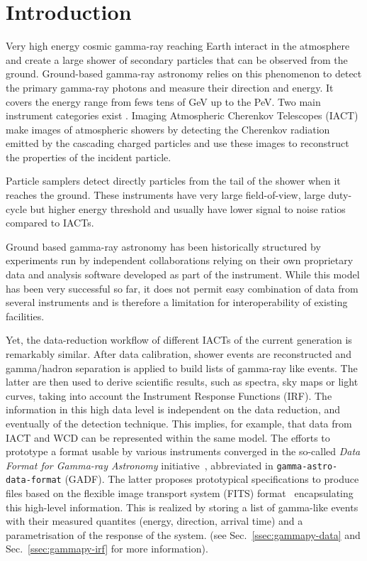 \section{Introduction}
\label{sec:introduction}



Very high energy cosmic gamma-ray reaching Earth interact in the atmosphere and
create a large shower of secondary particles that can be observed from the ground.
Ground-based gamma-ray astronomy relies on this phenomenon to detect the
primary gamma-ray photons and measure their direction and energy.
It covers the energy range from fews tens of GeV up to the PeV.
Two main instrument categories exist \citep{2015CRPhy..16..610D}.
Imaging Atmospheric Cherenkov Telescopes (IACT) make images of atmospheric showers
by detecting the Cherenkov radiation emitted by the cascading charged particles and
use these images to reconstruct the properties of the incident particle.

Particle samplers detect directly particles from the tail of the shower when it reaches
the ground. These instruments have very large field-of-view, large duty-cycle but higher
energy threshold and usually have lower signal to noise ratios compared to IACTs.

Ground based gamma-ray astronomy has been historically structured
by experiments run by independent collaborations relying
on their own proprietary data and analysis software developed as part of the
instrument. While this model has been very successful so far, it does not
permit easy combination of data from several instruments and is therefore
a limitation for interoperability of existing facilities.

Yet, the data-reduction workflow of different IACTs of the current generation is
remarkably similar. After data calibration, shower events are reconstructed and
gamma/hadron separation is applied to build lists of gamma-ray like events.
The latter are then used to derive scientific results, such as spectra, sky maps
or light curves, taking into account the Instrument Response Functions (IRF).
The information in this high data level is independent on
the data reduction, and eventually of the detection technique. This implies,
for example, that data from IACT and WCD can be represented within the same
model. The efforts to prototype a format usable by various instruments
converged in the so-called \textit{Data Format for Gamma-ray Astronomy}
initiative~\citep{gadf_proc, gadf_universe}, abbreviated in
\texttt{gamma-astro-data-format} (GADF). The latter proposes prototypical
specifications to produce files based on the flexible image transport system
(FITS) format~\citep{fits} encapsulating this high-level information. This is
realized by storing a list of gamma-like events with their measured quantites
(energy, direction, arrival time) and a parametrisation of the response of the
system. (see Sec.~\ref{ssec:gammapy-data} and Sec.~\ref{ssec:gammapy-irf} for
more information).

